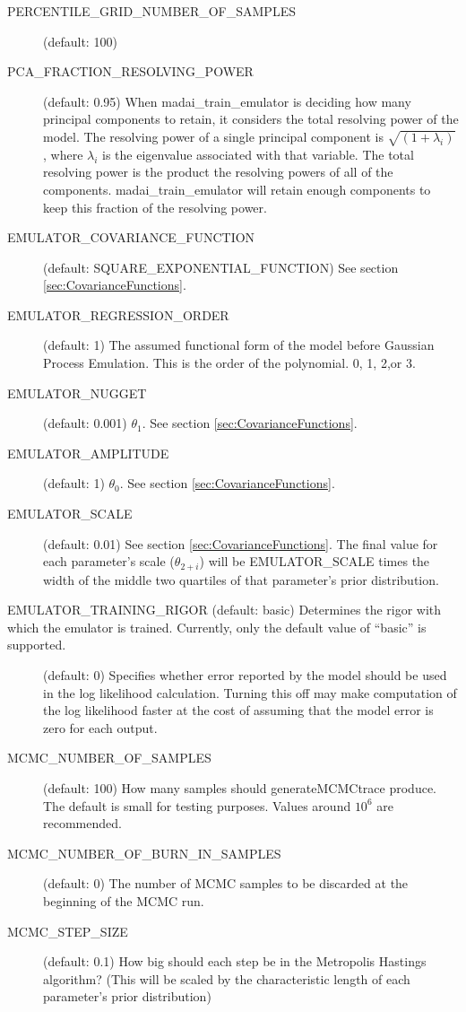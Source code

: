 \begin{description}
    \item[PERCENTILE\_GRID\_NUMBER\_OF\_SAMPLES] (default: 100)
    \item[PCA\_FRACTION\_RESOLVING\_POWER] (default: 0.95)  When madai\_train\_emulator is deciding how many principal components to retain, it considers the total resolving power of the model. The resolving power of a single principal component is $\sqrt{(1 + \lambda_i)}$, where $\lambda_i$ is the eigenvalue associated with that variable. The total resolving power is the product the resolving powers of all of the components. madai\_train\_emulator will retain enough components to keep this fraction of the resolving power.
    \item[EMULATOR\_COVARIANCE\_FUNCTION] (default: SQUARE\_EXPONENTIAL\_FUNCTION) See section \ref{sec:CovarianceFunctions}.
    \item[EMULATOR\_REGRESSION\_ORDER] (default: 1) The assumed functional form of the model before Gaussian Process Emulation. This is the order of the polynomial. 0, 1, 2,or 3.
    \item[EMULATOR\_NUGGET] (default: 0.001) $\theta_1$. See section \ref{sec:CovarianceFunctions}.
    \item[EMULATOR\_AMPLITUDE] (default: 1) $\theta_0$. See section \ref{sec:CovarianceFunctions}.
    \item[EMULATOR\_SCALE] (default: 0.01) See section \ref{sec:CovarianceFunctions}. The final value for each parameter's scale ($\theta_{2+i}$) will be EMULATOR\_SCALE times the width of the middle two quartiles of that parameter's prior distribution.
    \item[EMULATOR\_TRAINING\_RIGOR (default: basic) Determines the rigor with which the emulator is trained. Currently, only the default value of ``basic'' is supported.
    \item[MCMC\_USE\_MODEL\_ERROR] (default: 0) Specifies whether error reported by the model should be used in the log likelihood calculation. Turning this off may make computation of the log likelihood faster at the cost of assuming that the model error is zero for each output.
    \item[MCMC\_NUMBER\_OF\_SAMPLES] (default: 100) How many samples should generateMCMCtrace produce. The default is small for testing purposes. Values around $10^6$ are recommended.
    \item[MCMC\_NUMBER\_OF\_BURN\_IN\_SAMPLES] (default: 0) The number of MCMC samples to be discarded at the beginning of the MCMC run.
    \item[MCMC\_STEP\_SIZE] (default: 0.1) How big should each step be in the Metropolis Hastings algorithm? (This will be scaled by the characteristic length of each parameter's prior distribution)

\end{description}
